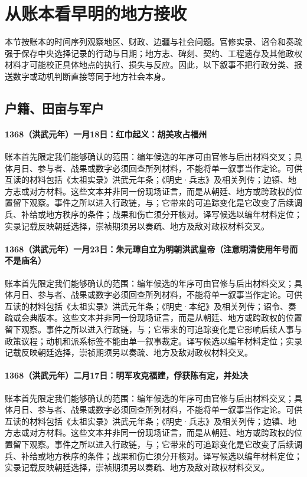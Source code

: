 \section{从账本看早明的地方接收}

本节按账本的时间序列观察地区、财政、边疆与社会问题。官修实录、诏令和奏疏强于保存中央选择记录的行动与日期；地方志、碑刻、契约、工程遗存及其他政权材料才可能校正具体地点的执行、损失与反应。因此，以下叙事不把行政分类、报送数字或动机判断直接等同于地方社会本身。

\subsection{户籍、田亩与军户}

\paragraph{1368（洪武元年）一月18日：红巾起义：胡美攻占福州} 账本首先限定我们能够确认的范围：编年候选的年序可由官修与后出材料交叉；具体月日、参与者、战果或数字必须回查所列材料，不能将单一叙事当作定论。可供互读的材料包括《太祖实录》洪武元年条；《明史·兵志》及相关列传；边镇、地方志或对方材料。这些文本并非同一份现场证言，而是从朝廷、地方或跨政权的位置留下观察。事件之所以进入行政链，与；它带来的可追踪变化是它改变了后续调兵、补给或地方秩序的条件；战果和伤亡须分开核对。译写候选以编年材料定位；实录记载反映朝廷选择，崇祯期须另以奏疏、地方及敌对政权材料交叉。

\paragraph{1368（洪武元年）一月23日：朱元璋自立为明朝洪武皇帝（注意明清使用年号而不是庙名）} 账本首先限定我们能够确认的范围：编年候选的年序可由官修与后出材料交叉；具体月日、参与者、战果或数字必须回查所列材料，不能将单一叙事当作定论。可供互读的材料包括《太祖实录》洪武元年条；《明史·本纪》及相关列传；诏令、奏疏或会典版本。这些文本并非同一份现场证言，而是从朝廷、地方或跨政权的位置留下观察。事件之所以进入行政链，与；它带来的可追踪变化是它影响后续人事与政策议程；动机和派系标签不能由单一叙事裁定。译写候选以编年材料定位；实录记载反映朝廷选择，崇祯期须另以奏疏、地方及敌对政权材料交叉。

\paragraph{1368（洪武元年）二月17日：明军攻克福建，俘获陈有定，并处决} 账本首先限定我们能够确认的范围：编年候选的年序可由官修与后出材料交叉；具体月日、参与者、战果或数字必须回查所列材料，不能将单一叙事当作定论。可供互读的材料包括《太祖实录》洪武元年条；《明史·兵志》及相关列传；边镇、地方志或对方材料。这些文本并非同一份现场证言，而是从朝廷、地方或跨政权的位置留下观察。事件之所以进入行政链，与；它带来的可追踪变化是它改变了后续调兵、补给或地方秩序的条件；战果和伤亡须分开核对。译写候选以编年材料定位；实录记载反映朝廷选择，崇祯期须另以奏疏、地方及敌对政权材料交叉。

